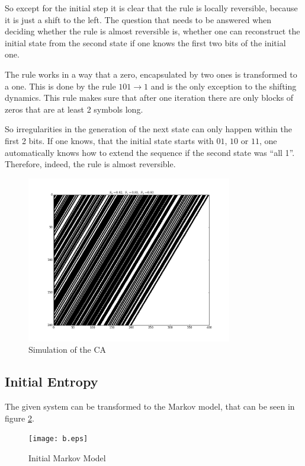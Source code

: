 \documentclass[12pt]{scrartcl}
\begin{document}
So except for the initial step it is clear that the rule is locally reversible, because it is just a shift to the left. The question that needs to be answered when deciding whether the rule is almost reversible is, whether one can reconstruct the initial state from the second state if one knows the first two bits of the initial one.

The rule works in a way that a zero, encapsulated by two ones is transformed to a one. This is done by the rule $101 \rightarrow 1$ and is the only exception to the shifting dynamics. This rule makes sure that after one iteration there are only blocks of zeros that are at least 2 symbols long.

So irregularities in the generation of the next state can only happen within the first 2 bits. If one knows, that the initial state starts with $01$, $10$ or $11$, one automatically knows how to extend the sequence if the second state was ``all 1''. Therefore, indeed, the rule is almost reversible.

\begin{figure}
\centering
\includegraphics[width=0.8\textwidth]{plot.png}
\caption{Simulation of the CA}
\label{fig:plot}
\end{figure}

\subsection*{Initial Entropy}

The given system can be transformed to the Markov model, that can be seen in figure \ref{fig:b}.

\begin{figure}
\centering
\texttt{[image: b.eps]}
\caption{Initial Markov Model}
\label{fig:b}
\end{figure}
\end{document}
